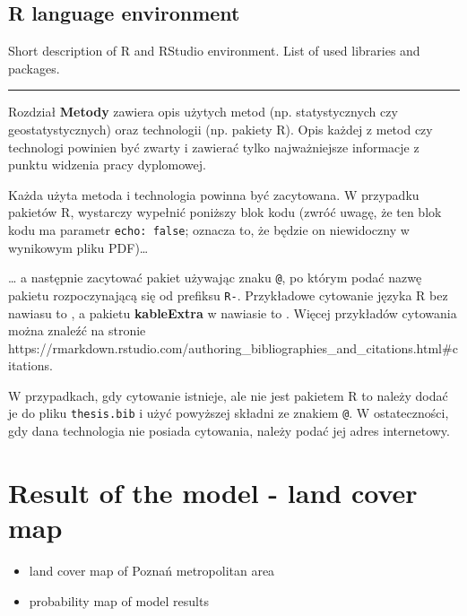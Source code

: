 \documentclass{amuthesis}
\begin{document}
\hypertarget{sec-r}{%
\section{R language environment}\label{sec-r}}

Short description of R and RStudio environment. List of used libraries
and packages.

\begin{center}\rule{0.5\linewidth}{0.5pt}\end{center}

Rozdział \textbf{Metody} zawiera opis użytych metod (np. statystycznych
czy geostatystycznych) oraz technologii (np. pakiety R). Opis każdej z
metod czy technologi powinien być zwarty i zawierać tylko najważniejsze
informacje z punktu widzenia pracy dyplomowej.

Każda użyta metoda i technologia powinna być zacytowana. W przypadku
pakietów R, wystarczy wypełnić poniższy blok kodu (zwróć uwagę, że ten
blok kodu ma parametr \texttt{echo:\ false}; oznacza to, że będzie on
niewidoczny w wynikowym pliku PDF)\ldots{}

\ldots{} a następnie zacytować pakiet używając znaku \texttt{@}, po
którym podać nazwę pakietu rozpoczynającą się od prefiksu \texttt{R-}.
Przykładowe cytowanie języka R bez nawiasu to \textcite{R-base}, a
pakietu \textbf{kableExtra} w nawiasie to \autocite{R-kableExtra}.
Więcej przykładów cytowania można znaleźć na stronie
https://rmarkdown.rstudio.com/authoring\_bibliographies\_and\_citations.html\#citations.

W przypadkach, gdy cytowanie istnieje, ale nie jest pakietem R to należy
dodać je do pliku \texttt{thesis.bib} i użyć powyższej składni ze
znakiem \texttt{@}. W ostateczności, gdy dana technologia nie posiada
cytowania, należy podać jej adres internetowy.


\hypertarget{sec-results-map}{%
\chapter{Result of the model - land cover map}\label{sec-results-map}}

\begin{itemize}
\item
  land cover map of Poznań metropolitan area
\item
  probability map of model results
\end{itemize}
\end{document}
